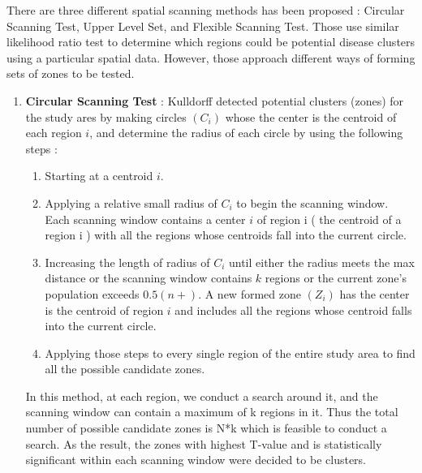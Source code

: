 \documentclass[12pt]{article}
\begin{document}
				There are three different spatial scanning methods has been proposed : Circular Scanning Test, Upper Level Set, and Flexible Scanning Test. Those use similar likelihood ratio test to determine which regions could be potential disease clusters using a particular spatial data. However, those approach different ways of forming sets of zones to be tested.\\			
				\begin{enumerate}
			\item \textbf{Circular Scanning Test} : Kulldorff detected potential clusters (zones) for the study ares by making circles $(C_i)$ whose the center is the centroid of each region $i$, and determine the radius of each circle by using the following steps : \\
	
			\begin{enumerate}
				\item Starting at a centroid $i$. 
				\item Applying a relative small radius of $C_i$ to begin the scanning window. Each scanning window contains a center $i$ of region i ( the centroid of a region i ) with all the regions whose centroids fall into the current circle. 
				\item Increasing the length of radius of $C_i$ until either the radius meets the max distance or the scanning window contains $k$ regions or the current zone's population exceeds $0.5(n+)$. A new formed zone $(Z_i)$ has the center is the centroid of region $i$ and includes all the regions whose centroid falls into the current circle. 
				\item Applying those steps to every single region of the entire study area to find all the possible candidate zones. 
			\end{enumerate}  
		In this method, at each region, we conduct a search around it, and the scanning window can contain a maximum of k regions in it. Thus the total number of possible candidate zones is N*k which is feasible to conduct a search.
		As the result, the zones with highest T-value and is statistically significant within each scanning window were decided to be clusters. \\
			

\end{enumerate}
\end{document}
